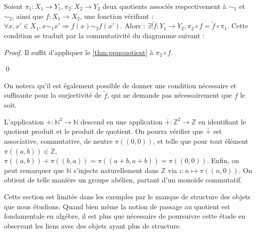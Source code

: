 \begin{corollary}{}
  \label{cor:doublequotient}
  Soient $\pi _{1}:X_{1} \to Y_{1}, \pi _2 : X_2 \to Y_2$ deux quotients associés respectivement à
  $\sim_1$ et $\sim_2$, ainsi que $f : X_1 \to X_2$, une fonction vérifiant : 
  $\forall x,x' \in X_1 , x \sim_1 x' \Rightarrow f(x) \sim_2 f(x')$.
  Alors : $\exists ! \tilde{f} : Y_1 \to Y_2 , \pi _2 \circ f = \tilde{f} \circ \pi _1$.
  Cette condition se traduit par la commutativité du diagramme suivant : 

  \begin{center}

      
  \end{center}
\end{corollary}

\begin{proof}
  Il suffit d'appliquer le \cref{thm:ppuquotient} à $\pi _2 \circ f$.

  \qed
\end{proof}

On notera qu'il est également possible de donner une condition nécessaire et suffisante pour la 
surjectivité de $\tilde{f}$, qui ne demande pas nécessairement que $f$ le soit.

\begin{example}
  \label{ex:Zmonoid}
  L'application $+ : \mathbb{N}^2 \to \mathbb{N}$ descend en une application $\bar{+} : \mathbb{Z}^2 \to \mathbb{Z}$
  en identifiant le quotient produit et le produit de quotient.
  On pourra vérifier que $\bar{+}$ est associative, commutative, de neutre $\pi ((0,0))$,
  et telle que pour tout élément $\pi ((a,b)) \in \mathbb{Z}$, $\pi ((a,b)) + \pi ((b,a)) = \pi ((a+b,a+b)) = \pi ((0,0))$.
  Enfin, on peut remarquer que $\mathbb{N}$ s'injecte naturellement dans $\mathbb{Z}$ via $\iota : n \mapsto \pi ((n,0))$.
  On obtient de telle manière un groupe abélien, partant d'un monoïde commutatif.
\end{example}

Cette section est limitée dans les exemples par le manque de structure des objets que nous étudions.
Quand bien même la notion de passage au quotient est fondamentale en algèbre, il est plus que nécessaire
de poursuivre cette étude en observant les liens avec des objets ayant plus de structure.

\nocite{*}
{}







